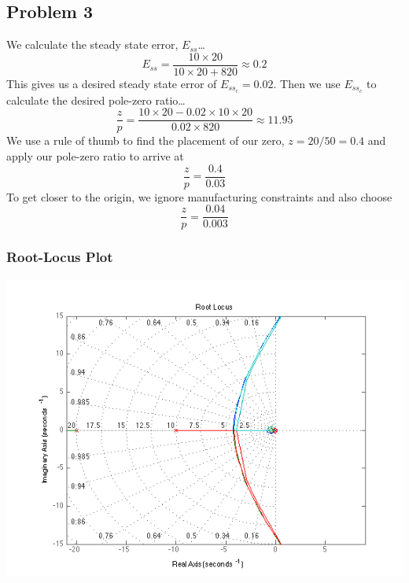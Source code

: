 \documentclass[letterpaper,10pt]{article}
\begin{document}
\begin{center}
\end{center}

\subsection*{Problem 3}
We calculate the steady state error, $E_{ss}$\dots
\[E_{ss} = \dfrac{10\times 20}{10\times 20+820}\approx 0.2\]
This gives us a desired steady state error of $E_{ss_{c}} = 0.02$.  Then we use $E_{ss_{c}}$ to calculate the desired pole-zero ratio\dots
\[\dfrac{z}{p} = \dfrac{10\times 20 - 0.02\times 10\times 20}{0.02\times 820}\approx 11.95\]
We use a rule of thumb to find the placement of our zero, $z = 20/50 = 0.4$ and apply our pole-zero ratio to arrive at
\[\dfrac{z}{p} = \dfrac{0.4}{0.03}\]
To get closer to the origin, we ignore manufacturing constraints and also choose
\[\dfrac{z}{p} = \dfrac{0.04}{0.003}\]

\subsubsection*{Root-Locus Plot}
\begin{center}
	\includegraphics[scale=0.75]{3-rlocus.png}
\end{center}
\end{document}
